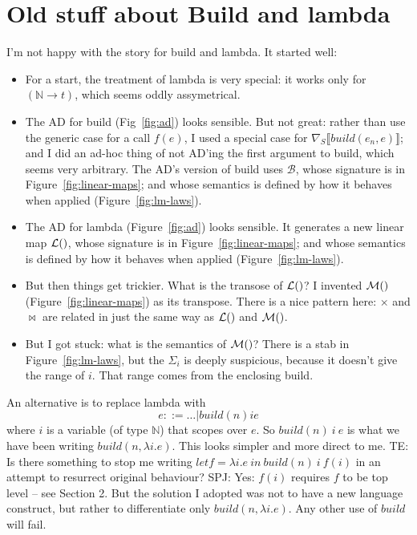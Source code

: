 \documentclass[sigplan,review]{acmart}
\renewcommand{\to}{\rightarrow}    %
\newcommand{\grad}[1]{\nabla_S\lb #1 \rb}  %
\newcommand{\lb}{\llbracket}
\newcommand{\rb}{\rrbracket}
\newcommand{\buildfun}{\mathit{build}}
\newcommand{\nat}{\mathbb{N}}        %
\newcommand{\lmpair}{\times}         %
\newcommand{\lmjoin}{\bowtie}        %
\newcommand{\lmlam}[1]{{\mathcal L}(#1)}      %
\newcommand{\lmlamt}[1]{{\mathcal M}(#1)}     %
\newcommand{\lmbuild}{\mathcal B}             %
\newcommand{\simon}[1]{{\color{red}SPJ: #1}}
\newcommand{\tom}[1]{{\color{red}TE: #1}}
\begin{document}
\section{Old stuff about Build and lambda} \label{sec:build-lam-fail}

I'm not happy with the story for build and lambda. It started well:
\begin{itemize}
\item For a start, the treatment of lambda is very special: it works only
  for $(\nat \to t)$, which seems oddly assymetrical.

\item The AD for build (Fig~\ref{fig:ad}) looks sensible.
  But not great:  rather than use the generic case for a call $f(e)$,
  I used a special case for $\grad{\buildfun(e_n,e)}$; and I did
  an ad-hoc thing of not AD'ing the first argument to build, which
  seems very arbitrary.  The AD's version of build uses $\lmbuild$, whose
  signature is in Figure~\ref{fig:linear-maps}; and whose semantics is
  defined by how it behaves when applied (Figure~\ref{fig:lm-laws}).

\item The AD for lambda (Figure~\ref{fig:ad}) looks sensible.  It generates
  a new linear map $\lmlam$, whose
  signature is in Figure~\ref{fig:linear-maps}; and whose semantics is
  defined by how it behaves when applied (Figure~\ref{fig:lm-laws}).

\item But then things get trickier.  What is the transose of $\lmlam$?
  I invented $\lmlamt$ (Figure~\ref{fig:linear-maps}) as its transpose.
  There is a nice pattern here: $\lmpair$ and $\lmjoin$ are related
  in just the same way as $\lmlam$ and $\lmlamt$.

\item But I got stuck: what is the semantics of $\lmlamt$?
  There is a stab in Figure~\ref{fig:lm-laws}, but the $\Sigma_i$ is deeply
  suspicious, because it doesn't give the range of $i$.  That range comes
  from the enclosing build.
\end{itemize}

An alternative is to replace lambda with
$$
e ::= \ldots | \buildfun(n) i e
$$
where $i$ is a variable (of type $\nat$) that scopes over $e$.
So $\buildfun(n)~ i~ e$ is what we have been writing $\buildfun(n, \lambda i.e)$.
This looks simpler and more direct to me.
\tom{Is there something to stop me writing $let f = \lambda i.e~ in~
  \buildfun(n)~ i~ f(i)$ in an attempt to resurrect original behaviour?}
\simon{Yes: $f(i)$ requires $f$ to be top level -- see Section 2.  But
  the solution I adopted was not to have a new language construct, but
  rather to differentiate only $\buildfun(n, \lambda i.e)$.  Any other
  use of $\buildfun$ will fail.}
\end{document}
